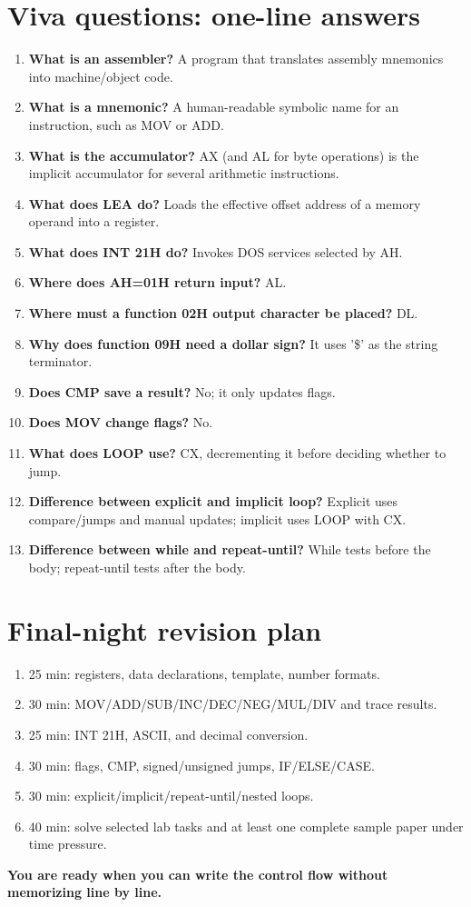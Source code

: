 \documentclass[11pt,a4paper]{article}
\begin{document}
\section{Viva questions: one-line answers}
\begin{enumerate}
\item \textbf{What is an assembler?} A program that translates assembly mnemonics into machine/object code.
\item \textbf{What is a mnemonic?} A human-readable symbolic name for an instruction, such as MOV or ADD.
\item \textbf{What is the accumulator?} AX (and AL for byte operations) is the implicit accumulator for several arithmetic instructions.
\item \textbf{What does LEA do?} Loads the effective offset address of a memory operand into a register.
\item \textbf{What does INT 21H do?} Invokes DOS services selected by AH.
\item \textbf{Where does AH=01H return input?} AL.
\item \textbf{Where must a function 02H output character be placed?} DL.
\item \textbf{Why does function 09H need a dollar sign?} It uses '\$' as the string terminator.
\item \textbf{Does CMP save a result?} No; it only updates flags.
\item \textbf{Does MOV change flags?} No.
\item \textbf{What does LOOP use?} CX, decrementing it before deciding whether to jump.
\item \textbf{Difference between explicit and implicit loop?} Explicit uses compare/jumps and manual updates; implicit uses LOOP with CX.
\item \textbf{Difference between while and repeat-until?} While tests before the body; repeat-until tests after the body.
\end{enumerate}

\section{Final-night revision plan}
\begin{tcolorbox}[colback=greenish,colframe=green!45!black,title=Suggested 3-hour sequence]
\begin{enumerate}
\item 25 min: registers, data declarations, template, number formats.
\item 30 min: MOV/ADD/SUB/INC/DEC/NEG/MUL/DIV and trace results.
\item 25 min: INT 21H, ASCII, and decimal conversion.
\item 30 min: flags, CMP, signed/unsigned jumps, IF/ELSE/CASE.
\item 30 min: explicit/implicit/repeat-until/nested loops.
\item 40 min: solve selected lab tasks and at least one complete sample paper under time pressure.
\end{enumerate}
\end{tcolorbox}

\begin{center}\Large\bfseries You are ready when you can write the control flow without memorizing line by line.\end{center}
\end{document}

